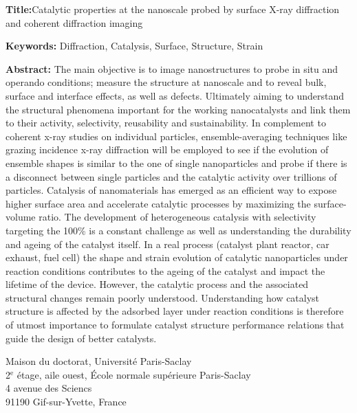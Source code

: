 \begin{mdframed}[linecolor=Prune,linewidth=1]

\textbf{Title:}Catalytic properties at the nanoscale probed by surface X-ray diffraction and coherent diffraction imaging

\noindent \textbf{Keywords:} Diffraction, Catalysis, Surface, Structure, Strain

\begin{multicols}{2}
\noindent \textbf{Abstract:} The main objective is to image nanostructures to probe in situ and operando conditions; measure the structure at nanoscale and to reveal bulk, surface and interface effects, as well as defects. Ultimately aiming to understand the structural phenomena important for the working nanocatalysts and link them to their activity, selectivity, reusability and sustainability. In complement to coherent x-ray studies on individual particles, ensemble-averaging techniques like grazing incidence x-ray diffraction will be employed to see if the evolution of ensemble shapes is similar to the one of single nanoparticles and probe if there is a disconnect between single particles and the catalytic activity over trillions of particles. Catalysis of nanomaterials has emerged as an efficient way to expose higher surface area and accelerate catalytic processes by maximizing the surface-volume ratio. The development of heterogeneous catalysis with selectivity targeting the 100\% is a constant challenge as well as understanding the durability and ageing of the catalyst itself. In a real process (catalyst plant reactor, car exhaust, fuel cell) the shape and strain evolution of catalytic nanoparticles under reaction conditions contributes to the ageing of the catalyst and impact the lifetime of the device. However, the catalytic process and the associated structural changes remain poorly understood. Understanding how catalyst structure is affected by the adsorbed layer under reaction conditions is therefore of utmost importance to formulate catalyst structure performance relations that guide the design of better catalysts.
\end{multicols}
\end{mdframed}

\vspace{\fill} %

\noindent
\color{Prune} \footnotesize Maison du doctorat, Université Paris-Saclay\\
2$^{\mathrm{e}}$ étage, aile ouest, École normale supérieure Paris-Saclay\\
4 avenue des Sciencs\\
91190 Gif-sur-Yvette, France